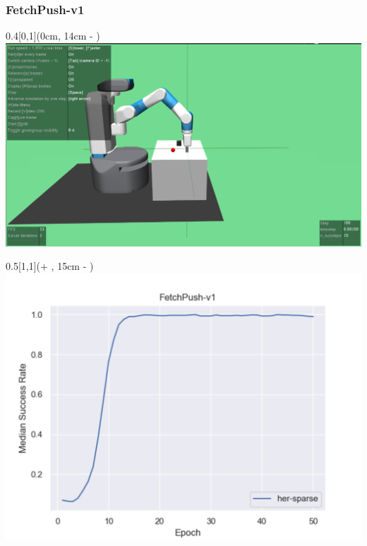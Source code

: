 

\begin{frame}
	\frametitle{FetchPush-v1}	
	\vspace{1cm}
	
	\begin{textblock*}{0.4\paperwidth}[0,1](0cm, 14cm - \PraesentationSeitenrand)%
		\includegraphics[width=0.4\paperwidth]{./Ressourcen/Figures/FetchPush-v1.pdf}
	\end{textblock*}
	
	\begin{textblock*}{0.5\paperwidth}[1,1](\textwidth + \PraesentationSeitenrand, 15cm - \PraesentationSeitenrand)%
		\includegraphics[width=0.5\paperwidth]{./Ressourcen/Figures/fig_FetchPush-v1.pdf}
	\end{textblock*}
	
\end{frame}
\clearpage


